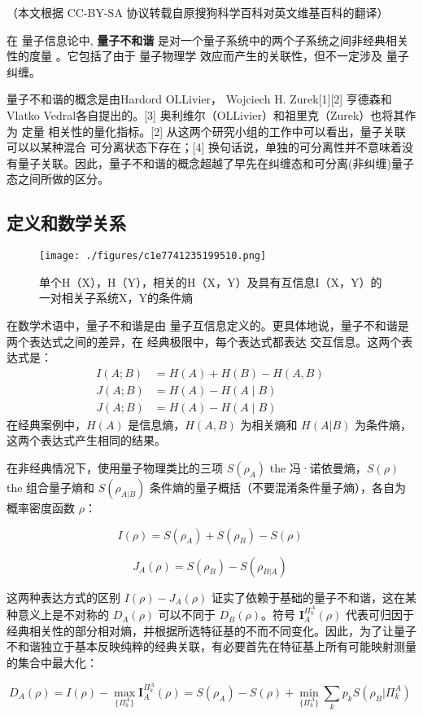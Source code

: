 
（本文根据 CC-BY-SA 协议转载自原搜狗科学百科对英文维基百科的翻译）

在 量子信息论中, \textbf{量子不和谐} 是对一个量子系统中的两个子系统之间非经典相关性的度量 。它包括了由于 量子物理学 效应而产生的关联性，但不一定涉及 量子纠缠。

量子不和谐的概念是由Hardord OLLivier， Wojciech H. Zurek[1][2] 亨德森和 Vlatko Vedral各自提出的。[3] 奥利维尔（OLLivier）和祖里克（Zurek）也将其作为 定量 相关性的量化指标。[2] 从这两个研究小组的工作中可以看出，量子关联可以以某种混合 可分离状态下存在；[4] 换句话说，单独的可分离性并不意味着没有量子关联。因此，量子不和谐的概念超越了早先在纠缠态和可分离(非纠缠)量子态之间所做的区分。

\subsection{定义和数学关系}
\begin{figure}[ht]
\centering
\texttt{[image: ./figures/c1e7741235199510.png]}
\caption{单个H（X），H（Y），相关的H（X，Y）及具有互信息I（X，Y）的一对相关子系统X，Y的条件熵} \label{fig_LZBHX_1}
\end{figure}
在数学术语中，量子不和谐是由 量子互信息定义的。更具体地说，量子不和谐是两个表达式之间的差异，在 经典极限中，每个表达式都表达 交互信息。这两个表达式是：
\begin{equation}
\begin{aligned}
I(A; B) &= H(A) + H(B) - H(A, B) \\
J(A; B) &= H(A) - H(A \mid B) \\
J(A; B) &= H(A) - H(A \mid B)
\end{aligned}~
\end{equation}
在经典案例中，$H(A)$ 是信息熵，$H(A, B)$ 为相关熵和 $H(A|B)$ 为条件熵，这两个表达式产生相同的结果。

在非经典情况下，使用量子物理类比的三项 $S(\rho_A)$ the 冯·诺依曼熵，$S(\rho)$ the 组合量子熵和 $S(\rho_{A|B})$ 条件熵的量子概括（不要混淆条件量子熵），各自为概率密度函数 $\rho$：

$$I(\rho) = S(\rho_A) + S(\rho_B) - S(\rho)~$$

$$J_A(\rho) = S(\rho_B) - S(\rho_{B|A})~$$

这两种表达方式的区别 $I(\rho) - J_A(\rho)$ 证实了依赖于基础的量子不和谐，这在某种意义上是不对称的 $D_A(\rho)$ 可以不同于 $D_B(\rho)$。符号 $\mathbf{I}_A^{\Pi^A_k}(\rho)$ 代表可归因于经典相关性的部分相对熵，并根据所选特征基的不而不同变化。因此，为了让量子不和谐独立于基本反映纯粹的经典关联，有必要首先在特征基上所有可能映射测量的集合中最大化：

$$D_A(\rho) = I(\rho) - \max_{\{\Pi^A_k\}} \mathbf{I}_A^{\Pi^A_k}(\rho) = S(\rho_A) - S(\rho) + \min_{\{\Pi^A_k\}} \sum_k p_k S(\rho_B|\Pi^A_k)~$$